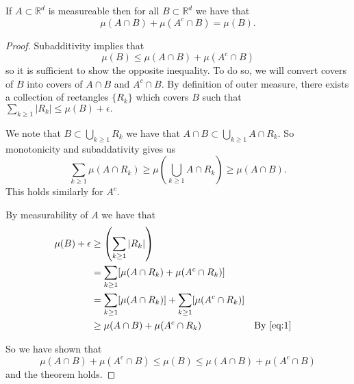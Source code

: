 \documentclass{amsart}
\newcommand{\parens}[1]{\left( #1\right)}
\theoremstyle{definition}
\numberwithin{equation}{section}
\newcommand{\s}[1]{\{#1\}}
\newcommand{\R}{\mathbb{R}}
\begin{document}
  \begin{lemma}

    If $A \subset \R^d$ is measureable then for all $B \subset \R^d$ we have that
    \[\mu(A \cap B) + \mu(A^c \cap B) = \mu(B).\]

  \end{lemma}

    \begin{proof}

      Subadditivity implies that
      \[\mu(B) \leq \mu(A \cap B) + \mu(A^c \cap B)\]
      so it is sufficient to show the opposite inequality. To do so, we will convert covers of $B$ into covers of $A \cap B$ and $A^c \cap B.$
      By definition of outer measure, there exists a collection of rectangles $\s{R_k}$ which covers $B$ such that $\sum_{k\geq1}|R_k| \leq \mu(B) + \epsilon.$

      We note that $B \subset \bigcup_{k\geq1}R_k$ we have that $A \cap B \subset \bigcup_{k\geq1}A \cap R_k.$ So monotonicity and subaddativity gives us
      \begin{equation}\label{eq:1}
        \sum_{k\geq1}\mu(A \cap R_k) \geq \mu(\bigcup_{k\geq1}A \cap R_k) \geq \mu(A \cap B).
      \end{equation}
      This holds similarly for $A^c.$

      By measurability of $A$ we have that
      \begin{align*}
        \mu(B) + \epsilon &\geq \parens{\sum_{k\geq1}|R_k|}\\
        &= \sum_{k\geq1}[\mu(A \cap R_k) + \mu(A^c \cap R_k)]\\
        &= \sum_{k\geq1}[\mu(A \cap R_k)] + \sum_{k\geq1}[\mu(A^c \cap R_k)]\\
        &\geq \mu(A \cap B) + \mu(A^c \cap R_k) &&\text{By }\ref{eq:1}
      \end{align*}

      So we have shown that
      \[\mu(A \cap B) + \mu(A^c \cap B) \leq \mu(B) \leq \mu(A \cap B) + \mu(A^c \cap B)\]
      and the theorem holds.

    \end{proof}
\end{document}
